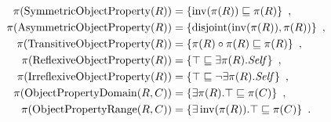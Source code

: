 \begin{definition}
\begin{widepage}
\begin{align*}
      \pi(\operatorname{SymmetricObjectProperty}(R)) ={} & \{ \operatorname{inv}(\pi(R)) \sqsubseteq \pi(R) \} \enspace, \\
      \pi(\operatorname{AsymmetricObjectProperty}(R)) ={} & \{ \operatorname{disjoint}(\operatorname{inv}(\pi(R)), \pi(R)) \} \enspace, \\
      \pi(\operatorname{TransitiveObjectProperty}(R)) ={} & \{ \pi(R) \circ \pi(R) \sqsubseteq \pi(R) \} \enspace, \\
      \pi(\operatorname{ReflexiveObjectProperty}(R)) ={} & \{ \top \sqsubseteq \exists \pi(R).\mathit{Self} \} \enspace, \\
      \pi(\operatorname{IrreflexiveObjectProperty}(R)) ={} & \{ \top \sqsubseteq \lnot \exists \pi(R).\mathit{Self} \} \enspace, \\
      \pi(\operatorname{ObjectPropertyDomain}(R, C)) ={} & \{ \exists \pi(R).\top \sqsubseteq \pi(C) \} \enspace, \\
      \pi(\operatorname{ObjectPropertyRange}(R, C)) ={} & \{ \exists \operatorname{inv}(\pi(R)).\top \sqsubseteq \pi(C) \} \enspace.
    \end{align*}
  \end{widepage}
\end{definition}
